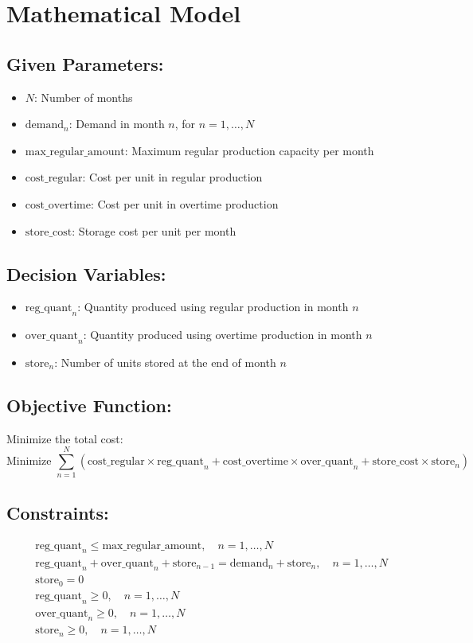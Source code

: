 \documentclass{article}
\begin{document}
\section*{Mathematical Model}

\subsection*{Given Parameters:}
\begin{itemize}
    \item $N$: Number of months
    \item $\text{demand}_n$: Demand in month $n$, for $n = 1, \ldots, N$
    \item $\text{max\_regular\_amount}$: Maximum regular production capacity per month
    \item $\text{cost\_regular}$: Cost per unit in regular production
    \item $\text{cost\_overtime}$: Cost per unit in overtime production
    \item $\text{store\_cost}$: Storage cost per unit per month
\end{itemize}

\subsection*{Decision Variables:}
\begin{itemize}
    \item $\text{reg\_quant}_n$: Quantity produced using regular production in month $n$
    \item $\text{over\_quant}_n$: Quantity produced using overtime production in month $n$
    \item $\text{store}_n$: Number of units stored at the end of month $n$
\end{itemize}

\subsection*{Objective Function:}
Minimize the total cost:
\[
\text{Minimize } \sum_{n=1}^{N} \left( \text{cost\_regular} \times \text{reg\_quant}_n + \text{cost\_overtime} \times \text{over\_quant}_n + \text{store\_cost} \times \text{store}_n \right)
\]

\subsection*{Constraints:}
\begin{align}
    & \text{reg\_quant}_n \leq \text{max\_regular\_amount}, \quad n = 1, \ldots, N \\
    & \text{reg\_quant}_n + \text{over\_quant}_n + \text{store}_{n-1} = \text{demand}_n + \text{store}_n, \quad n = 1, \ldots, N \\
    & \text{store}_0 = 0 \\
    & \text{reg\_quant}_n \geq 0, \quad n = 1, \ldots, N \\
    & \text{over\_quant}_n \geq 0, \quad n = 1, \ldots, N \\
    & \text{store}_n \geq 0, \quad n = 1, \ldots, N
\end{align}
\end{document}
